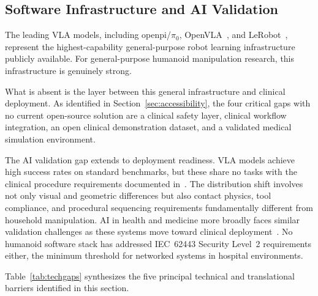 \documentclass[acmjour]{acmart}
\begin{document}
\subsection{Software Infrastructure and AI Validation}
\label{sec:software}

The leading VLA models, including openpi/$\pi_0$, OpenVLA~\cite{kim2024openvla},
and LeRobot~\cite{cadene2024lerobot}, represent the highest-capability general-purpose
robot learning infrastructure publicly available. For general-purpose humanoid
manipulation research, this infrastructure is genuinely strong.

What is absent is the layer between this general infrastructure and clinical
deployment. As identified in Section~\ref{sec:accessibility}, the four critical gaps
with no current open-source solution are a clinical safety layer, clinical
workflow integration, an open clinical demonstration dataset, and a validated
medical simulation environment.

The AI validation gap extends to deployment readiness. VLA models achieve high
success rates on standard benchmarks, but these share no tasks with the clinical
procedure requirements documented in~\cite{atar2025humanoids}. The distribution
shift involves not only visual and geometric differences but also contact physics,
tool compliance, and procedural sequencing requirements fundamentally different
from household manipulation. AI in health and medicine more broadly faces similar
validation challenges as these systems move toward clinical
deployment~\cite{topol2019high,rajpurkar2022ai,coiera2019last,sendak2020real}. No humanoid software stack has
addressed IEC~62443 Security Level~2 requirements either, the minimum threshold
for networked systems in hospital environments.

Table~\ref{tab:techgaps} synthesizes the five principal technical and
translational barriers identified in this section.
\end{document}
